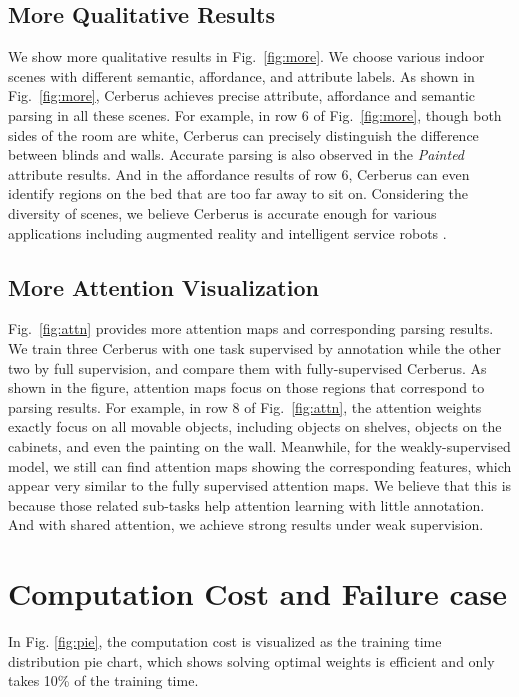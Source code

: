 \documentclass[10pt,twocolumn,letterpaper]{article}
\begin{document}
\subsection{More Qualitative Results}

We show more qualitative results in Fig.~\ref{fig:more}.  We choose various indoor scenes with different semantic, affordance, and attribute labels. As shown in Fig.~\ref{fig:more}, Cerberus achieves precise attribute, affordance and semantic parsing in all these scenes. For example, in row 6 of Fig.~\ref{fig:more}, though both sides of the room are white, Cerberus can precisely distinguish the difference between blinds and walls. Accurate parsing is also observed in the \emph{Painted} attribute results.  And in the affordance results of row 6, Cerberus can even identify regions on the bed that are too far away to sit on.  Considering the diversity of scenes, we believe Cerberus is accurate enough for various applications including augmented reality and intelligent service robots . 

\subsection{More Attention Visualization}

Fig.~\ref{fig:attn} provides more attention maps and corresponding parsing results. We train three Cerberus with one task supervised by  annotation while the other two by full supervision, and compare them with fully-supervised Cerberus.  As shown in the figure, attention maps focus on those regions that correspond to parsing results. For example, in row 8 of Fig.~\ref{fig:attn}, the attention weights exactly focus on all movable objects, including objects on shelves, objects on the cabinets, and even the painting on the wall. Meanwhile, for the weakly-supervised model, we still can find attention maps showing the corresponding features, which appear very similar to the fully supervised attention maps. We believe that this is because those related sub-tasks help attention learning with little annotation. And with shared attention, we achieve strong results under weak supervision.

\section{Computation Cost and Failure case}
In Fig. \ref{fig:pie}, the computation cost is visualized as the training time distribution pie chart, which shows solving optimal weights is efficient and only takes 10\% of the training time. 
\end{document}
